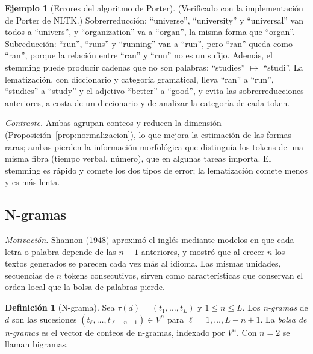 \documentclass[11pt]{article}
\theoremstyle{definition}
\newtheorem{definicion}[teorema]{Definición}
\newtheorem{ejemplo}[teorema]{Ejemplo}
\theoremstyle{remark}
\begin{document}
\begin{ejemplo}[Errores del algoritmo de Porter]\label{ej:porter}
\noindent (Verificado con la implementación de Porter de NLTK.) Sobrerreducción: ``universe'', ``university'' y ``universal'' van todos a ``univers'', y ``organization'' va a ``organ'', la misma forma que ``organ''. Subreducción: ``run'', ``runs'' y ``running'' van a ``run'', pero ``ran'' queda como ``ran'', porque la relación entre ``ran'' y ``run'' no es un sufijo. Además, el stemming puede producir cadenas que no son palabras: ``studies'' $\mapsto$ ``studi''. La lematización, con diccionario y categoría gramatical, lleva ``ran'' a ``run'', ``studies'' a ``study'' y el adjetivo ``better'' a ``good'', y evita las sobrerreducciones anteriores, a costa de un diccionario y de analizar la categoría de cada token.
\end{ejemplo}

\noindent \emph{Contraste.} Ambas agrupan conteos y reducen la dimensión (Proposición~\ref{prop:normalizacion}), lo que mejora la estimación de las formas raras; ambas pierden la información morfológica que distinguía los tokens de una misma fibra (tiempo verbal, número), que en algunas tareas importa. El stemming es rápido y comete los dos tipos de error; la lematización comete menos y es más lenta.

\subsection{N-gramas}\label{sec:ngramas}

\noindent \emph{Motivación.} Shannon (1948) aproximó el inglés mediante modelos en que cada letra o palabra depende de las $n-1$ anteriores, y mostró que al crecer $n$ los textos generados se parecen cada vez más al idioma. Las mismas unidades, secuencias de $n$ tokens consecutivos, sirven como características que conservan el orden local que la bolsa de palabras pierde.

\begin{definicion}[N-grama]\label{def:ngrama}
\noindent Sea $\tau(d)=(t_1,\dots,t_L)$ y $1\le n\le L$. Los \emph{n-gramas} de $d$ son las sucesiones $(t_\ell,\dots,t_{\ell+n-1})\in V^n$ para $\ell=1,\dots,L-n+1$. La \emph{bolsa de n-gramas} es el vector de conteos de n-gramas, indexado por $V^n$. Con $n=2$ se llaman bigramas.
\end{definicion}
\end{document}
